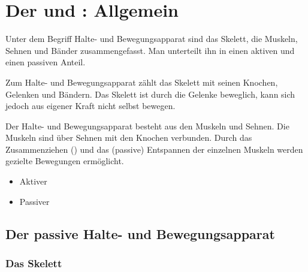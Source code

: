 \nocite{UlfigHistologie1,LippertAnatomie7,GantenMolGrund97}

\clearpage%

\section{Der  und : 
Allgemein}

\TextSlide{{\TxBeschreibung}}
{%
Unter dem Begriff Halte- und Bewegungsapparat sind 
das Skelett, 
die Muskeln, 
Sehnen 
und Bänder 
zusammengefasst. 
%
Man unterteilt ihn in 
einen aktiven 
und einen passiven 
Anteil.


Zum  Halte- und Bewegungsapparat zählt das Skelett mit seinen
Knochen, 
Gelenken 
und Bändern. 
%
Das Skelett ist durch die Gelenke beweglich, kann sich jedoch aus eigener Kraft 
nicht selbst bewegen.


Der  Halte- und Bewegungsapparat besteht aus den Muskeln 
und Sehnen.
%
Die Muskeln sind über Sehnen mit den Knochen verbunden.
% 
Durch das  Zusammenziehen () 
und das (passive) Entspannen der einzelnen Muskeln 
werden gezielte Bewegungen ermöglicht. 

}
{%
\begin{itemize}
	\item Aktiver
	\item Passiver
\end{itemize}
}

\subsection{Der passive Halte- und Bewegungsapparat}

\subsubsection{Das Skelett}

